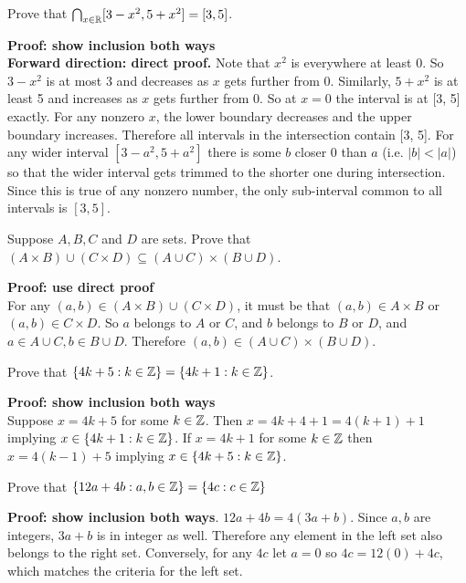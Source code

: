 \documentclass{article}
\begin{document}
\begin{problem}
Prove that $\bigcap_{x \in \mathbb{R}} [3 - x^2, 5 + x^2] = [3, 5]$.
\end{problem}

\textbf{Proof: show inclusion both ways}
\\
\textbf{Forward direction: direct proof.} Note that $x^2$ is everywhere at least 0. So $3 - x^2$ is at most 3 and decreases as $x$ gets further from 0. Similarly, $5 + x^2$ is at least 5 and increases as $x$ gets further from 0. So at $x = 0$ the interval is at [3, 5] exactly. For any nonzero $x$, the lower boundary decreases and the upper boundary increases. Therefore all intervals in the intersection contain [3, 5]. For any wider interval $[3 - a^2, 5 + a^2]$ there is some $b$ closer 0 than $a$ (i.e. $|b| < |a|$) so that the wider interval gets trimmed to the shorter one during intersection. Since this is true of any nonzero number, the only sub-interval common to all intervals is $[3, 5]$.

\begin{problem}
Suppose $A, B, C$ and $D$ are sets. Prove that $(A \times B) \cup (C \times D) \subseteq (A \cup C) \times (B \cup D)$.
\end{problem}

\textbf{Proof: use direct proof}
\\

For any $(a, b) \in (A \times B) \cup (C \times D)$, it must be that $(a, b) \in A \times B$ or $(a, b) \in C \times D$. So $a$ belongs to $A$ or $C$, and $b$ belongs to $B$ or $D$, and $a \in A \cup C, b \in B \cup D$. Therefore $(a, b) \in (A \cup C) \times (B \cup D)$.

\begin{problem}
Prove that $\{4k + 5: k \in \mathbb{Z}\} = \{4k + 1: k \in \mathbb{Z}\}$.
\end{problem}

\textbf{Proof: show inclusion both ways}
\\
Suppose $x = 4k + 5$ for some $k \in \mathbb{Z}$. Then $x = 4k + 4 + 1 = 4(k + 1) + 1$ implying $x \in \{4k + 1: k \in \mathbb{Z}\}$. If $x = 4k + 1$ for some $k \in \mathbb{Z}$ then $x = 4(k - 1) + 5$ implying $x \in \{4k + 5: k \in \mathbb{Z}\}$.

\begin{problem}
Prove that $\{12a + 4b : a, b \in \mathbb{Z}\} = \{4c: c \in \mathbb{Z}\}$
\end{problem}

\textbf{Proof: show inclusion both ways}. $12a + 4b = 4(3a + b)$. Since $a, b$ are integers, $3a + b$ is in integer as well. Therefore any element in the left set also belongs to the right set. Conversely, for any $4c$ let $a = 0$ so $4c = 12(0) + 4c$, which matches the criteria for the left set.
\end{document}
